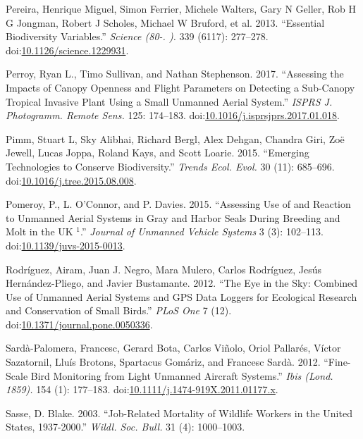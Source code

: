 \documentclass[]{interact}
\theoremstyle{plain}%
\theoremstyle{definition}
\theoremstyle{remark}
\begin{document}
\hypertarget{ref-pereira_essential_2013}{}
Pereira, Henrique Miguel, Simon Ferrier, Michele Walters, Gary N Geller,
Rob H G Jongman, Robert J Scholes, Michael W Bruford, et al. 2013.
``Essential Biodiversity Variables.'' \emph{Science (80-. ).} 339
(6117): 277--278.
doi:\href{https://doi.org/10.1126/science.1229931}{10.1126/science.1229931}.

\hypertarget{ref-perroy_assessing_2017}{}
Perroy, Ryan L., Timo Sullivan, and Nathan Stephenson. 2017. ``Assessing
the Impacts of Canopy Openness and Flight Parameters on Detecting a
Sub-Canopy Tropical Invasive Plant Using a Small Unmanned Aerial
System.'' \emph{ISPRS J. Photogramm. Remote Sens.} 125: 174--183.
doi:\href{https://doi.org/10.1016/j.isprsjprs.2017.01.018}{10.1016/j.isprsjprs.2017.01.018}.

\hypertarget{ref-pimm_emerging_2015}{}
Pimm, Stuart L, Sky Alibhai, Richard Bergl, Alex Dehgan, Chandra Giri,
Zoë Jewell, Lucas Joppa, Roland Kays, and Scott Loarie. 2015. ``Emerging
Technologies to Conserve Biodiversity.'' \emph{Trends Ecol. Evol.} 30
(11): 685--696.
doi:\href{https://doi.org/10.1016/j.tree.2015.08.008}{10.1016/j.tree.2015.08.008}.

\hypertarget{ref-pomeroy_assessing_2015}{}
Pomeroy, P., L. O'Connor, and P. Davies. 2015. ``Assessing Use of and
Reaction to Unmanned Aerial Systems in Gray and Harbor Seals During
Breeding and Molt in the UK \(^{\textrm{1}}\).'' \emph{Journal of
Unmanned Vehicle Systems} 3 (3): 102--113.
doi:\href{https://doi.org/10.1139/juvs-2015-0013}{10.1139/juvs-2015-0013}.

\hypertarget{ref-rodriguez_eye_2012}{}
Rodríguez, Airam, Juan J. Negro, Mara Mulero, Carlos Rodríguez, Jesús
Hernández-Pliego, and Javier Bustamante. 2012. ``The Eye in the Sky:
Combined Use of Unmanned Aerial Systems and GPS Data Loggers for
Ecological Research and Conservation of Small Birds.'' \emph{PLoS One} 7
(12).
doi:\href{https://doi.org/10.1371/journal.pone.0050336}{10.1371/journal.pone.0050336}.

\hypertarget{ref-sarda-palomera_fine-scale_2012}{}
Sardà-Palomera, Francesc, Gerard Bota, Carlos Viñolo, Oriol Pallarés,
Víctor Sazatornil, Lluís Brotons, Spartacus Gomáriz, and Francesc Sardà.
2012. ``Fine-Scale Bird Monitoring from Light Unmanned Aircraft
Systems.'' \emph{Ibis (Lond. 1859).} 154 (1): 177--183.
doi:\href{https://doi.org/10.1111/j.1474-919X.2011.01177.x}{10.1111/j.1474-919X.2011.01177.x}.

\hypertarget{ref-sasse_job-related_2003}{}
Sasse, D. Blake. 2003. ``Job-Related Mortality of Wildlife Workers in
the United States, 1937-2000.'' \emph{Wildl. Soc. Bull.} 31 (4):
1000--1003.
\end{document}
